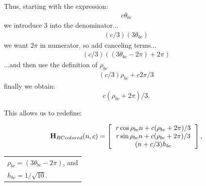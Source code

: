 \documentclass[twocolumn,10pt]{asme2ej}
\renewcommand{\vec}[1]{\mathbf{#1}}
\begin{document}


Thus, starting with the expression:
\begin{align*}
  c \theta_{bc} 
\end{align*}
we introduce 3 into the denominator...
\begin{align*}
  (c/3)  (3 \theta_{bc}) 
\end{align*}
we want $2\pi$ in numerator, so add canceling terms...
\begin{align*}
  (c/ 3) ((3 \theta_{bc} - 2 \pi)  + 2 \pi) 
\end{align*}
...and then use the definition of $\rho_{bc}$
\begin{align*}
  (c / 3) \rho_{bc}  + c 2 \pi /3 
\end{align*}
finally we obtain:
\begin{equation}
  c  ( \rho_{bc} +  2 \pi) /3  \text{.}
\end{equation}  

This allows us to redefine:

\begin{equation}
\vec{H}_{BCcolored}(n,c) =
\left [
  \begin{tabular}{c}
    $ r  \cos{\rho_{bc} n + c (\rho_{bc} +  2 \pi) /3} $\\
   $ r  \sin{\rho_{bc} n + c (\rho_{bc} +  2 \pi) /3} $\\
   $ (n+c/3)  h_{bc} $
  \end{tabular}
  \right ],
\end{equation}
  \begin{tabular}{l}
    $\rho_{bc} = (3 \theta_{bc} - 2 \pi)$, and \\
    $ h_{bc} = 1/\sqrt{10} $. \\    
  \end{tabular}      
\end{document}
